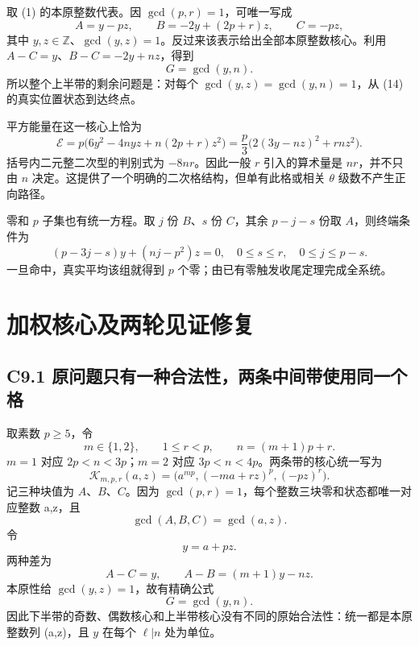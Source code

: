 {取} {(1)} {的本原整数代表。因} \(\gcd(p,r)=1\){，可唯一写成} \[
A=y-pz,\qquad B=-2y+(2p+r)z,\qquad C=-pz,
\tag{C8.14}
\] {其中} \(y,z\in\mathbb Z\){、}\(\gcd(y,z)=1\){。反过来该表示给出全部本原整数核心。利用} \(A-C=y\){、}\(B-C=-2y+nz\){，得到} \[
\boxed{G=\gcd(y,n).}
\tag{C8.15}
\] {所以整个上半带的剩余问题是：对每个} \(\gcd(y,z)=\gcd(y,n)=1\){，从} {(14)} {的真实位置状态到达终点。}

{平方能量在这一核心上恰为} \[
\mathcal E
=p\bigl(6y^2-4nyz+n(2p+r)z^2\bigr)
=\frac p3\bigl(2(3y-nz)^2+rnz^2\bigr).
\tag{C8.16}
\] {括号内二元整二次型的判别式为} \(-8nr\){。因此一般} \(r\) {引入的算术量是} \(nr\){，并不只由} \(n\) {决定。这提供了一个明确的二次格结构，但单有此格或相关} {\ensuremath{\theta }} {级数不产生正向路径。}

{零和} \(p\) {子集也有统一方程。取} \(j\) {份} \(B\){、}\(s\) {份} \(C\){，其余} \(p-j-s\) {份取} \(A\){，则终端条件为} \[
\boxed{(p-3j-s)y+(nj-p^2)z=0,\quad
0\le s\le r,\quad 0\le j\le p-s.}
\tag{C8.17}
\] {一旦命中，真实平均该组就得到} \(p\) {个零；由已有零触发收尾定理完成全系统。}


\section{加权核心及两轮见证修复}\label{construct:core-entry}
\subsection*{\texorpdfstring{{C9.1} {原问题只有一种合法性，两条中间带使用同一个格}}{C9.1 原问题只有一种合法性，两条中间带使用同一个格}}\label{C9-h59}

{取素数} {\ensuremath{p\ge 5}，令} \[
m\in\{1,2\},\qquad 1\le r<p,\qquad n=(m+1)p+r.
\] {\ensuremath{m=1}} {对应} {\ensuremath{2p<n<3p}；\ensuremath{m=2}} {对应} {\ensuremath{3p<n<4p}。两条带的核心统一写为} \[
\boxed{\mathcal K_{m,p,r}(a,z)=
\bigl(a^{mp},(-ma+rz)^p,(-pz)^r\bigr).}
\tag{C9.1}
\] {记三种块值为} {\ensuremath{A}、\ensuremath{B}、\ensuremath{C}。因为} {\ensuremath{\operatorname{gcd}(p,r)=1}，每个整数三块零和状态都唯一对应整数} {a,z，且} \[
\gcd(A,B,C)=\gcd(a,z).
\] {令} \[
y=a+pz.
\] {两种差为} \[
A-C=y,\qquad A-B=(m+1)y-nz.
\] {本原性给} {\ensuremath{\operatorname{gcd}(y,z)=1}，故有精确公式} \[
\boxed{G=\gcd(y,n).}
\tag{C9.2}
\] {因此下半带的奇数、偶数核心和上半带核心没有不同的原始合法性：统一都是本原整数列} {(a,z)，且} {\ensuremath{y}} {在每个} {\ensuremath{\ell |n}} {处为单位。}

